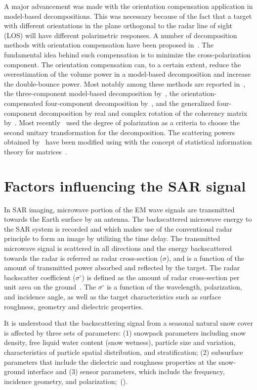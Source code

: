 A major advancement was made with the orientation compensation application in model-based decompositions. This was necessary because of the fact that a target with different orientations in the plane orthogonal to the radar line of sight (LOS) will have different polarimetric responses. A number of decomposition methods with orientation compensation have been proposed in~\citep{arii2011adaptive,YAMAGUCHI2011,singh13,Lee2011,An10,Chen14}. The fundamental idea behind such compensation is to minimize the cross-polarization component. The orientation compensation can, to a certain extent, reduce the overestimation of the volume power in a model-based decomposition and increase the double-bounce power. Most notably among these methods are reported in~\citep{Lee2011}, the three-component model-based decomposition by~\citep{An10}, the orientation-compensated four-component decomposition by~\citep{YAMAGUCHI2011}, and the generalized four-component decomposition by real and complex rotation of the coherency matrix by~\citep{singh13}. Most recently~\citep{bhattacharya2015adaptive} used the degree of polarization as a criteria to choose the second unitary transformation for the decomposition. The scattering powers obtained by~\cite{Yamaguchi2005} have been modified using with the concept of statistical information theory for matrices~\citep{bhattacharya2015modifying}.

\section{Factors influencing the SAR signal}
In SAR imaging, microwave portion of the EM wave signals are transmitted towards the Earth surface by an antenna. The backscattered microwave energy to the SAR system is recorded and which makes use of the conventional radar principle to form an image by utilizing the time delay. The transmitted microwave signal is scattered in all directions and the energy backscattered towards the radar is referred as radar cross-section ($\sigma$), and is a function of the amount of transmitted power absorbed and reflected by the target. The radar backscatter coefficient ($\sigma$$^\circ$) is defined as the amount of radar cross-section per unit area on the ground~\citep{jensen2000remote}. The $\sigma$$^\circ$ is a function of the wavelength, polarization, and incidence angle, as well as the target characteristics such as surface roughness, geometry and dielectric properties.

It is understood that the backscattering signal from a seasonal natural snow cover is affected by three sets of parameters: (1) snowpack parameters including snow density, free liquid water content (snow wetness), particle size and variation, characteristics of particle spatial distribution, and stratification; (2) subsurface parameters that include the dielectric and roughness properties at the snow-ground interface and (3) sensor parameters, which include the frequency, incidence geometry, and polarization;~(\cite{shi1992radar}). 

